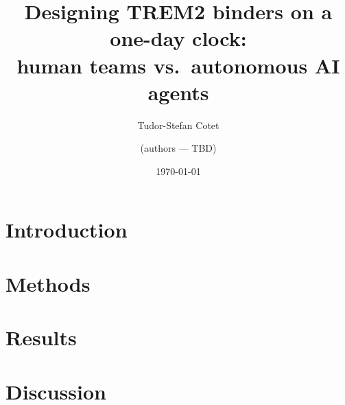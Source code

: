 \documentclass[11pt]{article}
\title{Designing TREM2 binders on a one-day clock:\\
human teams vs.\ autonomous AI agents}
\author[1]{Tudor-Stefan Cotet}
\author[1]{(authors --- TBD)}
\affil[1]{Adaptyv Bio}
\date{\today}
\begin{document}
\maketitle

\begin{abstract}

\end{abstract}

\section{Introduction}\label{sec:intro}


\section{Methods}\label{sec:methods}


\section{Results}\label{sec:results}


\section{Discussion}\label{sec:discussion}




\end{document}
